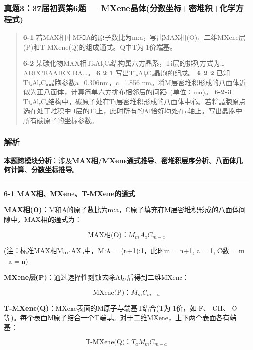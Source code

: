 \subsubsection{真题3：37届初赛第6题 --- MXene晶体(分数坐标+密堆积+化学方程式)}\label{ux771fux9898337ux5c4aux521dux8d5bux7b2c6ux9898-mxeneux6676ux4f53ux5206ux6570ux5750ux6807ux5bc6ux5806ux79efux5316ux5b66ux65b9ux7a0bux5f0f}

\begin{quote}
\textbf{6-1} 若MAX相中M和A的原子数比为m:a，写出MAX相(O)、二维MXene层(P)和T-MXene(Q)的组成通式。Q中T为-1价端基。

\textbf{6-2} 某碳化物MAX相TiₓAlᵧCᵤ结构属六方晶系，Ti层的排列方式为\ldots ABCCBAABCCBA\ldots。
\textbf{6-2-1} 写出TiₓAlᵧCᵤ晶胞的组成。
\textbf{6-2-2} 已知TiₓAlᵧCᵤ晶胞参数a=0.306nm，c=1.856 nm。将M层密堆积形成的八面体近似为正八面体，计算简单六方排布相邻层的间距d(单位：nm)。
\textbf{6-2-3} TiₓAlᵧCᵤ结构中，碳原子处在Ti层密堆积形成的八面体中心。若将晶胞原点选在处于堆积中B层的Ti上，此时所有的Al恰好均处在c轴上。写出晶胞中所有碳原子的坐标参数。
\end{quote}

\subsubsection{解析}\label{ux89e3ux6790-25}

\textbf{本题跨模块分析}：涉及\textbf{MAX相/MXene通式推导}、\textbf{密堆积层序分析}、\textbf{八面体几何计算}、\textbf{分数坐标推导}。

\begin{center}\rule{0.5\linewidth}{0.5pt}\end{center}

\textbf{6-1 MAX相、MXene、T-MXene的通式}

\textbf{MAX相(O)}：M和A的原子数比为m:a，C原子填充在M层密堆积形成的八面体间隙中。MAX相的通式为：

\[\text{MAX相(O)}：M_m A_a C_{m-a}\]

(注：标准MAX相Mₙ₊\textsubscript{1}AXₙ中，M:A = (n+1):1，此时m = n+1, a = 1, C数 = m - a = n)

\textbf{MXene层(P)}：通过选择性刻蚀去除A层后得到二维MXene：

\[\text{MXene(P)}：M_m C_{m-a}\]

\textbf{T-MXene(Q)}：MXene表面的M原子与端基T结合(T为-1价，如-F、-OH、-O等)。每个表面M原子结合一个T端基。对于二维MXene，上下两个表面各有端基：

\[\text{T-MXene(Q)}：T_a M_m C_{m-a}\]

